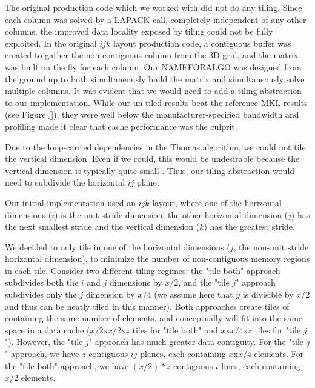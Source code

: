 \documentclass{sig-alternate-05-2015}
\begin{document}
The original production code which we worked with did not do any tiling. Since
each column was solved by a LAPACK call, completely independent of any other
columns, the improved data locality exposed by tiling could not be fully
exploited. In the original \(ijk\) layout production code, a contiguous buffer
was created to gather the non-contiguous column from the 3D grid, and the
matrix was built on the fly for each column. Our NAMEFORALGO was designed from
the ground up to both simultaneously build the matrix and simultaneously solve
multiple columns. It was evident that we would need to add a tiling abstraction
to our implementation. While our un-tiled results beat the reference MKL
results (see Figure \ref{}), they were well below the manufacturer-specified
bandwidth and profiling made it clear that cache performance was the culprit.

Due to the loop-carried dependencies in the Thomas algorithm, we could not tile
the vertical dimension. Even if we could, this would be undesirable because the
vertical dimension is typically quite small . Thus, our tiling 
abstraction would need to subdivide the horizontal \(ij\) plane.

Our initial implementation used an \(ijk\) layout, where one of the horizontal
dimensions (\(i\)) is the unit stride dimension, the other horizontal dimension
(\(j\)) has the next smallest stride and the vertical dimension (\(k\)) has the
greatest stride.

We decided to only tile in one of the horizontal dimensions (\(j\), the
non-unit stride horizontal dimension), to minimize the number of non-contiguous
memory regions in each tile. Consider two different tiling regimes: the "tile
both" approach subdivides both the \(i\) and \(j\) dimensions by \(x/2\), and
the "tile \(j\)" approach subdivides only the \(j\) dimension by \(x/4\) (we
assume here that \(y\) is divisible by \(x/2\) and thus can be neatly tiled in
this manner). Both approaches create tiles of containing the same number of
elements, and conceptually will fit into the same space in a data cache
(\(x/2\)x\(x/2\)x\(z\) tiles for "tile both" and \(x\)x\(x/4\)x\(z\) tiles for
"tile \(j\)"). However, the "tile \(j\)" approach has much greater data
contiguity. For the "tile \(j\)" approach, we have \(z\) contiguous
\(ij\)-planes, each containing \(x\)x\(x/4\) elements.  For the "tile both"
approach, we have \((x/2)*z\) contiguous \(i\)-lines, each containing \(x/2\)
elements.
\end{document}
